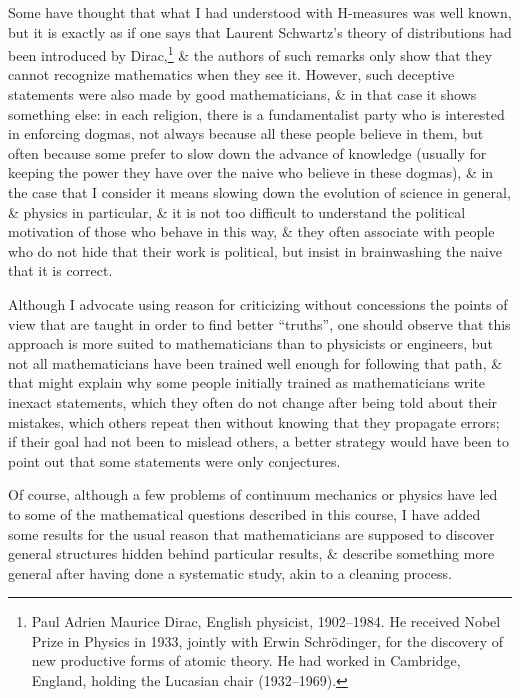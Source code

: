 \documentclass{article}
\begin{document}
\begin{enumerate}
	Some have thought that what I had understood with H-measures was well known, but it is exactly as if one says that {\sc Laurent Schwartz}'s theory of distributions had been introduced by {\sc Dirac},\footnote{{\sc Paul Adrien Maurice Dirac}, English physicist, 1902--1984. He received Nobel Prize in Physics in 1933, jointly with {\sc Erwin Schr\"odinger}, for the discovery of new productive forms of atomic theory. He had worked in Cambridge, England, holding the Lucasian chair (1932--1969).} \& the authors of such remarks only show that they cannot recognize mathematics when they see it. However, such deceptive statements were also made by good mathematicians, \& in that case it shows something else: in each religion, there is a fundamentalist party who is interested in enforcing dogmas, not always because all these people believe in them, but often because some prefer to slow down the advance of knowledge (usually for keeping the power they have over the naive who believe in these dogmas), \& in the case that I consider it means slowing down the evolution of science in general, \& physics in particular, \& it is not too difficult to understand the political motivation of those who behave in this way, \& they often associate with people who do not hide that their work is political, but insist in brainwashing the naive that it is correct.
	
	Although I advocate using reason for criticizing without concessions the points of view that are taught in order to find better ``truths'', one should observe that this approach is more suited to mathematicians than to physicists or engineers, but not all mathematicians have been trained well enough for following that path, \& that might explain why some people initially trained as mathematicians write inexact statements, which they often do not change after being told about their mistakes, which others repeat then without knowing that they propagate errors; if their goal had not been to mislead others, a better strategy would have been to point out that some statements were only conjectures.
	
	Of course, although a few problems of continuum mechanics or physics have led to some of the mathematical questions described in this course, I have added some results for the usual reason that mathematicians are supposed to discover general structures hidden behind particular results, \& describe something more general after having done a systematic study, akin to a cleaning process.
	

\end{enumerate}
\end{document}
